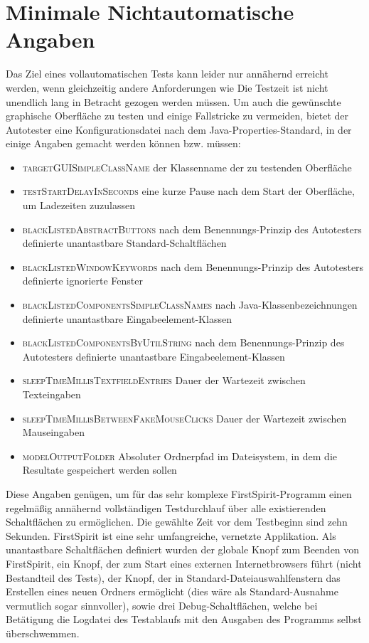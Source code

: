 \section{Minimale Nichtautomatische Angaben}

Das Ziel eines vollautomatischen Tests kann leider nur annähernd erreicht werden,
wenn gleichzeitig andere Anforderungen wie \glqq{}Die Testzeit ist nicht unendlich lang\grqq{}
in Betracht gezogen werden müssen. Um auch die gewünschte graphische Oberfläche zu
testen und einige Fallstricke zu vermeiden, bietet der Autotester eine Konfigurationsdatei
nach dem Java-\glqq{}Properties\grqq{}-Standard, in der einige Angaben gemacht werden können bzw. müssen:

\begin{itemize}
  \item \textsc{targetGUISimpleClassName} der Klassenname der zu testenden Oberfläche
  \item \textsc{testStartDelayInSeconds} eine kurze Pause nach dem Start der Oberfläche, um Ladezeiten zuzulassen
  \item \textsc{blackListedAbstractButtons} nach dem Benennungs-Prinzip des Autotesters definierte unantastbare Standard-Schaltflächen
  \item \textsc{blackListedWindowKeywords} nach dem Benennungs-Prinzip des Autotesters definierte ignorierte Fenster
  \item \textsc{blackListedComponentsSimpleClassNames} nach Java-Klassenbezeichnungen definierte unantastbare Eingabeelement-Klassen
  \item \textsc{blackListedComponentsByUtilString} nach dem Benennungs-Prinzip des Autotesters definierte unantastbare Eingabeelement-Klassen
  \item \textsc{sleepTimeMillisTextfieldEntries} Dauer der Wartezeit zwischen Texteingaben
  \item \textsc{sleepTimeMillisBetweenFakeMouseClicks} Dauer der Wartezeit zwischen Mauseingaben
  \item \textsc{modelOutputFolder} Absoluter Ordnerpfad im Dateisystem, in dem die Resultate gespeichert werden sollen
\end{itemize}

Diese Angaben genügen, um für das sehr komplexe FirstSpirit-Programm einen regelmäßig annähernd
vollständigen Testdurchlauf über alle existierenden Schaltflächen zu ermöglichen.
Die gewählte Zeit vor dem Testbeginn sind zehn Sekunden. FirstSpirit ist eine sehr umfangreiche,
vernetzte Applikation. Als unantastbare Schaltflächen definiert wurden der globale Knopf
zum Beenden von FirstSpirit, ein Knopf, der zum Start eines externen Internetbrowsers führt
(nicht Bestandteil des Tests), der Knopf, der in Standard-Dateiauswahlfenstern das Erstellen eines neuen
Ordners ermöglicht (dies wäre als Standard-Ausnahme vermutlich sogar sinnvoller), sowie drei
Debug-Schaltflächen, welche bei Betätigung die Logdatei des Testablaufs mit den 
Ausgaben des Programms selbst überschwemmen.


